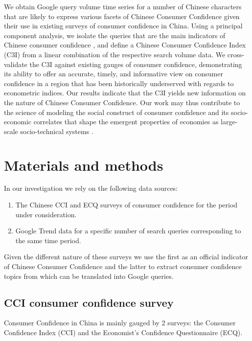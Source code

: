 \documentclass[10pt]{article}
\begin{document}
We obtain Google query volume time series for a number of Chinese
characters that are likely to express various facets of Chinese Consumer Confidence given their use in existing
surveys of consumer confidence in China. Using a principal component analysis, we isolate the queries that are the main indicators of 
Chinese consumer confidence \cite{Pearson1901}, and define a Chinese Consumer Confidence Index (C3I) from a linear combination
of the respective search volume data.  We cross-validate the C3I against existing gauges of consumer confidence, demonstrating
its ability to offer an accurate, timely, and informative view on consumer confidence in a 
region that has been historically underserved with regards to econometric indices.
Our results indicate that the C3I yields new information on the nature of Chinese 
Consumer Confidence. Our work may thus contribute to the science of modeling the social construct of consumer confidence and its socio-economic correlates that shape the emergent properties of economies as large-scale socio-technical systems \cite{vespignani:sociotechn2012}.


\section*{Materials and methods}
	In our investigation we rely on the following data sources:
	
	\begin{enumerate}
		\item The Chinese CCI and ECQ surveys of consumer confidence for the period under consideration.
		\item Google Trend data for a specific number of search queries corresponding to the same time period.
	\end{enumerate}
	
	Given the different nature of these surveys we use the first as an official indicator of Chinese Consumer Confidence and
	the latter to extract consumer confidence topics from which can be translated into Google queries.
	
	\subsection*{CCI consumer confidence survey}
	
	Consumer Confidence in China is mainly gauged by 2 surveys: the Consumer Confidence Index (CCI) and the 
	Economist's Confidence Questionnaire (ECQ). \\
	
\end{document}
